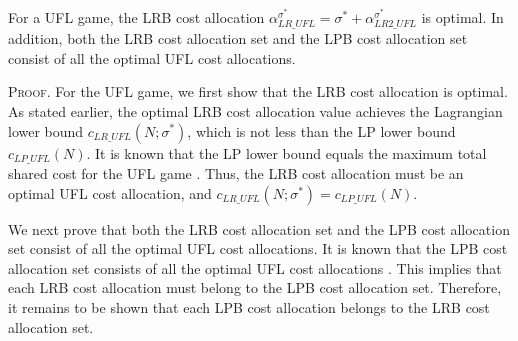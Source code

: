 \documentclass[ijoc,nonblindrev]{informs3} %
\begin{document}
\begin{theorem}\label{lemma:lpbequallrbufl}
For a UFL game, the LRB cost allocation $\alpha_{LR\_UFL}^{\sigma^*} = \sigma^* + \alpha_{LR2\_UFL}^{\sigma^*}$ is optimal. In addition, both the LRB cost allocation set and the LPB cost allocation set consist of all the optimal UFL cost allocations.
\end{theorem}
{\scshape Proof.}
For the UFL game, we first show that the LRB cost allocation is optimal. As stated earlier, the optimal LRB cost allocation value achieves the Lagrangian lower bound $c_{LR\_UFL}(N;\sigma^*)$, which is not less than the LP lower bound $c_{LP\_UFL}(N)$. It is known that the LP lower bound equals the maximum total shared cost for the UFL game \citep{Kolen1983FacilityLocationGame,Goemans2000FacilityLocationGames}. Thus, the LRB cost allocation must be an optimal UFL cost allocation, and $c_{LR\_UFL}(N;\sigma^*)=c_{LP\_UFL}(N)$.

We next prove that both the LRB cost allocation set and the LPB cost allocation set consist of all the optimal UFL cost allocations. It is known that the LPB cost allocation set consists of all the optimal UFL cost allocations \citep{Goemans2000FacilityLocationGames}. This implies that each LRB cost allocation must belong to the LPB cost allocation set. Therefore, it remains to be shown that each LPB cost allocation belongs to the LRB cost allocation set.
\end{document}
